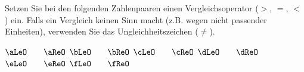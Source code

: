 Setzen Sie bei den folgenden Zahlenpaaren einen Vergleichsoperator ($>$, $=$, $<$) ein. Falls ein Vergleich keinen Sinn macht (z.B. wegen nicht passender Einheiten), verwenden Sie das Ungleichheitszeichen ($\neq$).

\begin{abcliste}
\abc $\aLeO \qquad \aReO$
\abc $\bLeO \qquad \bReO$
\abc $\cLeO \qquad \cReO$
\abc $\dLeO \qquad \dReO$
\abc $\eLeO \qquad \eReO$
\abc $\fLeO \qquad \fReO$
\end{abcliste}
